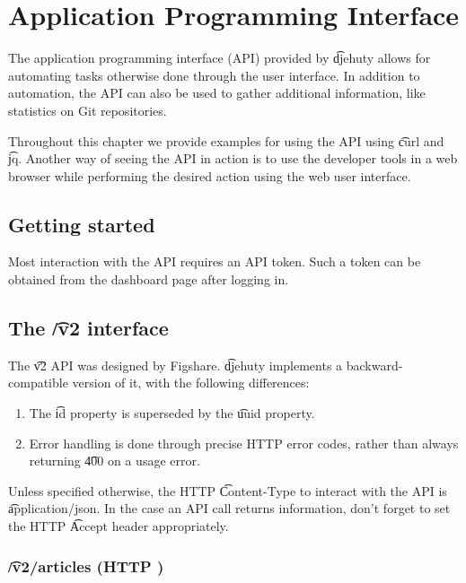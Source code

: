 \chapter{Application Programming Interface}

  The application programming interface (API) provided by \t{djehuty} allows
  for automating tasks otherwise done through the user interface.  In addition
  to automation, the API can also be used to gather additional information,
  like statistics on Git repositories.

  Throughout this chapter we provide examples for using the API using \t{curl} and \t{jq}.
  Another way of seeing the API in action is to use the developer tools in a web
  browser while performing the desired action using the web user interface.

\section{Getting started}

  Most interaction with the API requires an API token.  Such a token can be
  obtained from the dashboard page after logging in.

\section{The \t{/v2} interface}

  The \t{v2} API was designed by Figshare.
  \t{djehuty} implements a backward-compatible version of it, with the
  following differences:
  \begin{enumerate}
    \item{The \t{id} property is superseded by the \t{uuid} property.}
    \item{Error handling is done through precise HTTP error codes,
        rather than always returning \t{400} on a usage error.}
  \end{enumerate}

  Unless specified otherwise, the HTTP \t{Content-Type} to interact
  with the API is \t{application/json}.  In the case an API call returns
  information, don't forget to set the HTTP \t{Accept} header appropriately.

\subsection{\t{/v2/articles} (HTTP )}
\label{sec:v2-articles}

